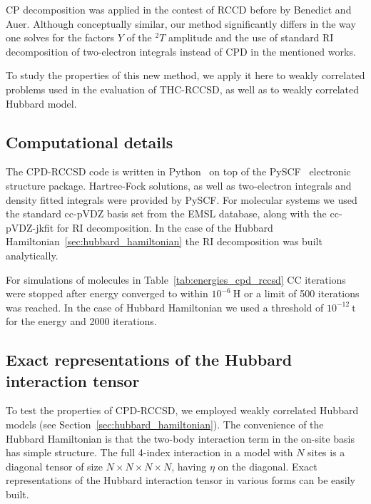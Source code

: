 CP decomposition was applied in the contest of RCCD before by Benedict and 
Auer.\cite{benedict_ccd, benedict_mp2} Although conceptually similar, our 
method significantly differs in the way one solves for the factors $Y$ of 
the ${}^2T$ amplitude and the use of standard RI decomposition of two-electron 
integrals instead of CPD in the mentioned works.

To study the properties of this new method, we apply it here to weakly 
correlated problems used in the evaluation of 
THC-RCCSD,\cite{schutski2017tensor} as well as to weakly correlated Hubbard 
model. 

\subsection{Computational details}
The CPD-RCCSD code is written in Python~\cite{van2007python} on top of the 
PySCF~\cite{sun2017python} electronic structure package. Hartree-Fock 
solutions, as well as two-electron integrals and density fitted integrals were 
provided by PySCF. For molecular systems we used the standard cc-pVDZ basis set 
from the EMSL database,\cite{schuchardt2007basis} along with the cc-pVDZ-jkfit 
for RI decomposition. In the case of the Hubbard 
Hamiltonian~\ref{sec:hubbard_hamiltonian}
the RI decomposition was built analytically.

For simulations of molecules in Table~\ref{tab:energies_cpd_rccsd} CC iterations 
were stopped after energy converged to within $10^{-6}~\mathrm{H}$ or a limit 
of 500 iterations was reached. In the case of Hubbard Hamiltonian we used a 
threshold of $10^{-12}~\mathrm{t}$ for the energy and 2000 iterations.

\subsection{Exact representations of the Hubbard interaction tensor}
To test the properties of CPD-RCCSD, we employed weakly correlated 
Hubbard models (see Section~\ref{sec:hubbard_hamiltonian}). 
The convenience of the Hubbard Hamiltonian is that the two-body interaction term 
in the on-site basis has simple structure. The full 4-index interaction in a 
model with $N$ sites is a diagonal tensor of size $N\times N\times N \times N$, 
having $\eta$ on the diagonal. Exact representations of the Hubbard interaction 
tensor in various forms can be easily built.

